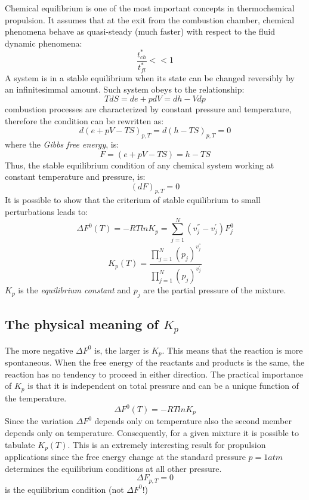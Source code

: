 \documentclass[12pt]{article}
\begin{document}
Chemical equilibrium is one of the most important concepts in thermochemical propulsion. It assumes that at the exit from the combustion chamber, chemical phenomena behave as quasi-steady (much faster) with respect to the fluid dynamic phenomena:
\begin{equation}
    \frac{t_{ch}^{*}}{t_{fl}^{*}} << 1
\end{equation}
A system is in a stable equilibrium when its state can be changed reversibly by an infinitesimmal amount. Such system obeys to the relationship:
\begin{equation}
    TdS=de+pdV=dh-Vdp
\end{equation}
combustion processes are characterized by constant pressure and temperature, therefore the condition can be rewritten as:
\begin{equation}
    d(e+pV-TS)_{p,T}=d(h-TS)_{p,T}=0
\end{equation}
where the \textit{Gibbs free energy}, is:
\begin{equation}
    F=(e+pV-TS)=h-TS
\end{equation}
Thus, the stable equilibrium condition of any chemical system working at constant temperature and pressure, is:
\begin{equation}
    (dF)_{p,T}=0
\end{equation}
It is possible to show that the criterium of stable equilibrium to small perturbations leads to:
\begin{equation}
    \Delta F^{0}(T)=-RTlnK_{p} = \sum_{j=1}^{N}(v_{j}^{''}-v_{j}^{'})F_{j}^{0}
\end{equation}
\begin{equation}
    K_{p}(T)= \frac{\prod_{j=1}^{N}(p_{j})^{v_{j}^{''}}}{\prod_{j=1}^{N}(p_{j})^{v_{j}^{'}}}
\end{equation}
$K_{p}$ is the \textit{equilibrium constant} and $p_{j}$ are the partial pressure of the mixture.

\subsection{The physical meaning of $K_{p}$}

The more negative $\Delta F^{0}$ is, the larger is $K_{p}$. This means that the reaction is more spontaneous. When the free energy of the reactants and products is the same, the reaction has no tendency to proceed in either direction.
The practical importance of $K_{p}$ is that it is independent on total pressure and can be a unique function of the temperature.
\begin{equation}
    \Delta F^{0}(T)=-RTlnK_{p}
\end{equation}
Since the variation $\Delta F^{0}$ depends only on temperature also the second member depends only on temperature.
Consequently, for a given mixture it is possible to tabulate $K_{p}(T)$. This is an extremely interesting result for propulsion applications since the free energy change at the standard pressure $p=1 atm$ determines the equilibrium conditions at all other pressure.
\begin{equation}
    \Delta F_{p,T}=0
\end{equation}
is the equilibrium condition (not $\Delta F^{0}$!)
\end{document}
